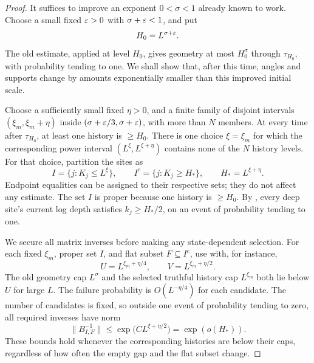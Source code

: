 \begin{proof}
It suffices to improve an exponent \(0<\sigma<1\) already known to work.
Choose a small fixed \(\varepsilon>0\) with \(\sigma+\varepsilon<1\), and put
\[
 H_0=L^{\sigma+\varepsilon}.
\]
The old estimate, applied at level \(H_0\), gives geometry at most
\(H_0^\sigma\) through \(\tau_{H_0}\), with probability tending to one.
We shall show that, after this time, angles and supports change by amounts
exponentially smaller than this improved initial scale.

Choose a sufficiently small fixed \(\eta>0\), and a finite family of
disjoint intervals \((\xi_m,\xi_m+\eta)\) inside
\((\sigma+\varepsilon/3,\sigma+\varepsilon)\), with more than \(N\) members.  At every
time after \(\tau_{H_0}\), at least one history is \(\ge H_0\).  There is
one choice \(\xi=\xi_m\) for which the corresponding power interval
\((L^\xi,L^{\xi+\eta})\) contains none of the \(N\) history levels.
For that choice, partition the sites as
\[
 I=\{j:K_j\le L^\xi\},\qquad
 I^c=\{j:K_j\ge H_*\},\qquad H_*=L^{\xi+\eta}.
\]
Endpoint equalities can be assigned to their respective sets; they do not
affect any estimate.  The set \(I\) is proper because one history is
\(\ge H_0\).  By , every deep site's current log depth
satisfies \(k_j\ge H_*/2\), on an event of probability tending to one.

We secure all matrix inverses before making any state-dependent selection.
For each fixed \(\xi_m\), proper set \(I\), and flat subset \(F\subseteq
I^c\), use  with, for instance,
\[
 U=L^{\xi_m+\eta/4},\qquad V=L^{\xi_m+\eta/2}.
\]
The old geometry cap \(L^\sigma\) and the selected truthful history cap
\(L^{\xi_m}\) both lie below \(U\) for large \(L\).  The failure probability
is \(O(L^{-\eta/4})\) for each candidate.  The number of candidates is
fixed, so outside one event of probability tending to zero, all required
inverses have norm
\begin{equation}
 \|B_{I,F}^{-1}\|\le
       \exp\bigl(C L^{\xi+\eta/2}\bigr)
       =\exp(o(H_*)).
 \label{odd:gap-inverse}
\end{equation}
These bounds hold whenever the corresponding histories are below their
caps, regardless of how often the empty gap and the flat subset change.


\end{proof}

